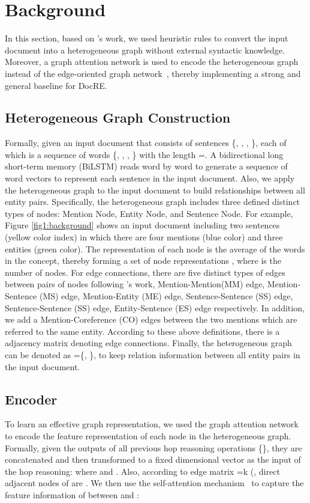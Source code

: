 \documentclass[letterpaper]{article} \usepackage{aaai21}  \usepackage{times}  \usepackage{helvet} \usepackage{courier}  \usepackage[hyphens]{url}  \usepackage{graphicx} \urlstyle{rm} \def\UrlFont{\rm}  \usepackage{natbib}  \usepackage{caption} \frenchspacing  \setlength{\pdfpagewidth}{8.5in}  \setlength{\pdfpageheight}{11in}  \usepackage{amsmath}
\begin{document}
\section{Background}


In this section, based on \cite{Christopoulou2019ConnectingTD}'s work, we used heuristic rules to convert the input document into a heterogeneous graph without external syntactic knowledge.
Moreover, a graph attention network is used to encode the heterogeneous graph instead of the edge-oriented graph network~\cite{Christopoulou2019ConnectingTD}, thereby implementing a strong and general baseline for DocRE.

\subsection{Heterogeneous Graph Construction}
Formally, given an input document that consists of  sentences \{, , , \}, each of which is a sequence of words \{, , , \} with the length =. 
A bidirectional long short-term memory (BiLSTM) reads word by word to generate a sequence of word vectors to represent each sentence in the input document.
Also, we apply the heterogeneous graph \cite{Christopoulou2019ConnectingTD} to the input document to build relationships between all entity pairs.
Specifically, the heterogeneous graph includes three defined distinct types of nodes: Mention Node, Entity Node, and Sentence Node.
For example, Figure \ref{fig1:background} shows an input document including two sentences (yellow color index) in which there are four mentions (blue color) and three entities (green color).
The representation of each node is the average of the words in the concept, thereby forming a set of node representations , where  is the number of nodes.
For edge connections, there are five distinct types of edges between pairs of nodes following \cite{Christopoulou2019ConnectingTD}'s work, Mention-Mention(MM) edge, Mention-Sentence (MS) edge, Mention-Entity (ME) edge, Sentence-Sentence (SS) edge, Sentence-Sentence (SS) edge, Entity-Sentence (ES) edge respectively.
In addition, we add a Mention-Coreference (CO) edges between the two mentions which are referred to the same entity.
According to these above definitions, there is a  adjacency matrix  denoting edge connections.
Finally, the heterogeneous graph can be denoted as =\{, \}, to keep relation information between all entity pairs in the input document.



\subsection{Encoder}
\label{Sec3-1}
To learn an effective graph representation, we used the graph attention network~\cite{guo-etal-2019-attention} to encode the feature representation of each node in the heterogeneous graph.
Formally, given the outputs of all previous hop reasoning operations \{\},
they are concatenated and then transformed to a fixed dimensional vector as the input of the  hop reasoning:
where  and .
Also, according to edge matrix =k (,  direct adjacent nodes of  are .
We then use the self-attention mechanism~\cite{NIPS2017_7181} to capture the feature information of  between  and :
\end{document}
